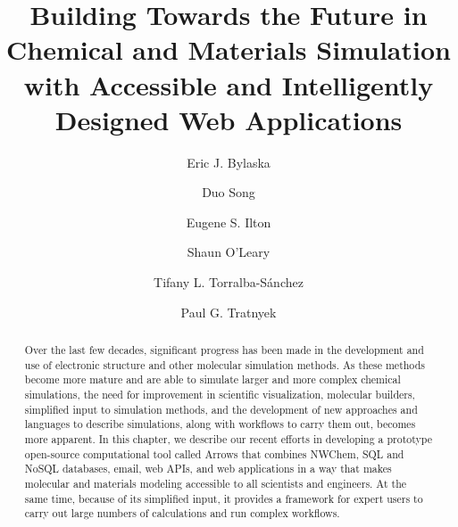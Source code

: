 \documentclass[runningheads,a4paper]{llncs}
\begin{document}
\mainmatter  %

\title{Building Towards the Future in Chemical and Materials Simulation with Accessible and Intelligently Designed Web Applications}


%
%

\author{Eric J. Bylaska \and
Duo Song \and 
Eugene S. Ilton \and
Shaun O'Leary \and
Tifany L. Torralba-Sánchez \and
Paul G. Tratnyek
}
%
%


\maketitle

\begin{abstract}
 Over the last few decades, significant progress has been made in the development and use of electronic structure and other molecular simulation methods.  As these methods become more mature and are able to simulate larger and more complex chemical simulations, the need for improvement in scientific visualization, molecular builders, simplified input to simulation methods,  and the development of new approaches and languages to describe simulations, along with workflows to carry them out, becomes more apparent.  
 In this chapter, we describe our recent efforts in developing a prototype open-source computational tool called Arrows that combines NWChem, SQL and NoSQL databases, email, web APIs, and web applications in a way that makes molecular and materials modeling accessible to all scientists and engineers.  At the same time, because of its simplified input, it provides a framework for expert users to carry out large numbers of calculations and run complex workflows.
\end{abstract}
\end{document}
